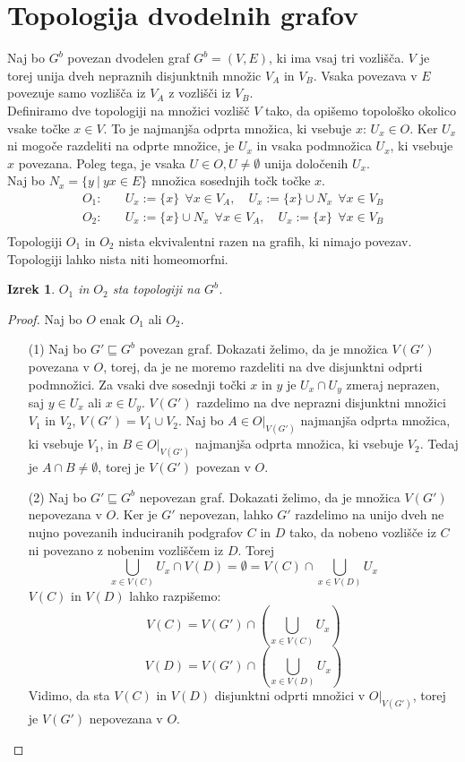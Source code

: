 \documentclass[a4paper, 12pt]{book}
\newtheorem{theorem}{Izrek}[section]
\theoremstyle{definition}
\begin{document}
\section{Topologija dvodelnih grafov}
Naj bo $G^b$ povezan dvodelen graf $G^b = (V,E)$, ki ima vsaj tri vozlišča.
$V$ je torej unija dveh nepraznih disjunktnih množic $V_A$ in $V_B$. Vsaka
povezava v $E$ povezuje samo vozlišča iz $V_A$ z vozlišči iz $V_B$.\\
Definiramo dve topologiji na množici vozlišč $V$ tako, da opišemo
topološko okolico vsake točke $x \in V$. To je najmanjša odprta množica, ki
vsebuje $x$: $U_x \in O$. Ker $U_x$ ni mogoče razdeliti na odprte množice, je $U_x$
in vsaka podmnožica $U_x$, ki vsebuje $x$ povezana.
Poleg tega, je vsaka $U \in O, U \neq \emptyset$ unija določenih $U_x$.\\
Naj bo $N_x = \{y \  | \  yx \in E\}$ množica sosednjih točk točke $x$.\\
\[
  \begin{split}
  O_1:&\quad
  U_x:=\{x\}\ \ \forall x \in V_A, \quad
  U_x:=\{x\}\cup N_x\ \  \forall x \in V_B\\
  O_2:&\quad
  U_x:=\{x\}\cup N_x\ \  \forall x \in V_A, \quad
  U_x:=\{x\}\ \ \forall x \in V_B\\
\end{split}
\]
Topologiji $O_1$ in $O_2$ nista ekvivalentni razen na grafih, ki nimajo povezav.
Topologiji lahko nista niti homeomorfni.
\begin{theorem}
  $O_1$ in $O_2$ sta topologiji na $G^b$.
\end{theorem}
\begin{proof}
  Naj bo $O$ enak $O_1$ ali $O_2$.
  \begin{itemize}
    \item[(1)] Naj bo $G' \sqsubseteq G^b$ povezan graf. Dokazati želimo, da je
    množica $V(G')$ povezana v $O$, torej, da je ne moremo razdeliti na dve
    disjunktni odprti podmnožici. Za vsaki dve sosednji točki $x$ in $y$ je
    $U_x \cap U_y$ zmeraj neprazen, saj $y \in U_x$ ali $x \in U_y$. $V(G')$
    razdelimo na dve neprazni disjunktni množici $V_1$ in $V_2$,
    $V(G') = V_1 \cup V_2$. Naj bo $A \in O|_{V(G')}$
    najmanjša odprta množica, ki vsebuje $V_1$, in $B \in O|_{V(G')}$
    najmanjša odprta množica, ki vsebuje $V_2$. Tedaj je $A \cap B \neq \emptyset$,
    torej je $V(G')$ povezan v $O$.
    \item[(2)] Naj bo $G' \sqsubseteq G^b$ nepovezan graf. Dokazati želimo, da
    je množica $V(G')$ nepovezana v $O$. Ker je $G'$ nepovezan, lahko $G'$ razdelimo
    na unijo dveh ne nujno povezanih induciranih podgrafov $C$ in $D$ tako, da nobeno vozlišče iz $C$
    ni povezano z nobenim vozliščem iz $D$. Torej
    \[\bigcup_{x\in V(C)}U_x \cap V(D) = \emptyset = V(C) \cap \bigcup_{x\in V(D)}U_x\]
    $V(C)$ in $V(D)$ lahko razpišemo:
    \[V(C) = V(G') \cap \left(\bigcup_{x\in V(C)} U_x\right)\]
    \[V(D) = V(G') \cap \left(\bigcup_{x\in V(D)} U_x\right)\]
    Vidimo, da sta $V(C)$ in $V(D)$ disjunktni odprti množici v $O|_{V(G')}$,
    torej je $V(G')$ nepovezana v $O$.
  \end{itemize}
\end{proof}
\end{document}
